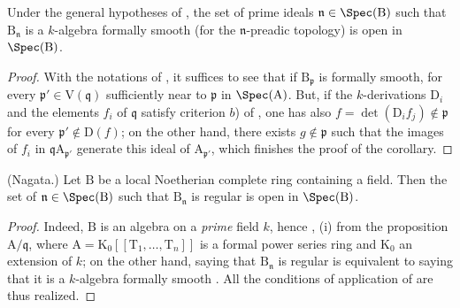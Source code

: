 \begin{corollary}[22.7.5]
\label{0.22.7.5}
Under the general hypotheses of , the set of prime ideals $\mathfrak{n}\in\Spec(\mathrm{B})$ such that $\mathrm{B}_\mathfrak{n}$ is a $k$-algebra formally smooth (for the $\mathfrak{n}$-preadic topology) is open in $\Spec(\mathrm{B})$.
\end{corollary}

\begin{proof}
With the notations of , it suffices to see that if $\mathrm{B}_\mathfrak{p}$ is formally smooth, for every $\mathfrak{p}'\in\mathrm{V}(\mathfrak{q})$ sufficiently near to $\mathfrak{p}$ in $\Spec(\mathrm{A})$.
But, if the $k$-derivations $\mathrm{D}_i$ and the elements $f_i$ of $\mathfrak{q}$ satisfy criterion $b$) of , one has also $f=\det(\mathrm{D}_if_j)\notin\mathfrak{p}$ for every $\mathfrak{p}'\notin\mathrm{D}(f)$; on the other hand, there exists $g\notin\mathfrak{p}$ such that the images of $f_i$ in $\mathfrak{q}\mathrm{A}_{\mathfrak{p}'}$ generate this ideal of $\mathrm{A}_{\mathfrak{p}'}$, which finishes the proof of the corollary.
\end{proof}

\begin{corollary}[22.7.6]
\label{0.22.7.6}
\textnormal{(Nagata.)}
Let $\mathrm{B}$ be a local Noetherian complete ring containing a field.
Then the set of $\mathfrak{n}\in\Spec(\mathrm{B})$ such that $\mathrm{B}_\mathfrak{n}$ is regular is open in $\Spec(\mathrm{B})$.
\end{corollary}

\begin{proof}
Indeed, $\mathrm{B}$ is an algebra on a \emph{prime} field $k$, hence , (i) from the proposition $\mathrm{A}/\mathfrak{q}$, where $\mathrm{A}=\mathrm{K}_0[[\mathrm{T}_1,\ldots,\mathrm{T}_n]]$ is a formal power series ring and $\mathrm{K}_0$ an extension of $k$; on the other hand, saying that $\mathrm{B}_\mathfrak{n}$ is regular is equivalent to saying that it is a $k$-algebra formally smooth .
All the conditions of application of  are thus realized.
\end{proof}

